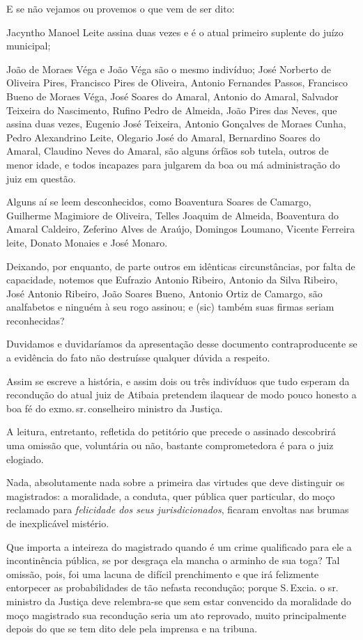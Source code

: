 E se não vejamos ou provemos o que vem de ser dito:

Jacyntho Manoel Leite assina duas vezes e é o atual primeiro suplente do
juízo municipal;

João de Moraes Véga e João Véga são o mesmo indivíduo; José Norberto de
Oliveira Pires, Francisco Pires de Oliveira, Antonio Fernandes Passos,
Francisco Bueno de Moraes Véga, José Soares do Amaral, Antonio do
Amaral, Salvador Teixeira do Nascimento, Rufino Pedro de Almeida, João
Pires das Neves, que assina duas vezes, Eugenio José Teixeira, Antonio
Gonçalves de Moraes Cunha, Pedro Alexandrino Leite, Olegario José do
Amaral, Bernardino Soares do Amaral, Claudino Neves do Amaral, são
alguns órfãos sob tutela, outros de menor idade, e todos incapazes para
julgarem da boa ou má administração do juiz em questão.

Alguns aí se leem desconhecidos, como Boaventura Soares de Camargo,
Guilherme Magimiore de Oliveira, Telles Joaquim de Almeida, Boaventura
do Amaral Caldeiro, Zeferino Alves de Araújo, Domingos Loumano, Vicente
Ferreira leite, Donato Monaies e José Monaro.

Deixando, por enquanto, de parte outros em idênticas circunstâncias, por
falta de capacidade, notemos que Eufrazio Antonio Ribeiro, Antonio da
Silva Ribeiro, José Antonio Ribeiro, João Soares Bueno, Antonio Ortiz de
Camargo, são analfabetos e ninguém à seu rogo assinou; e (sic) também
suas firmas seriam reconhecidas?

Duvidamos e duvidaríamos da apresentação desse documento
contraproducente se a evidência do fato não destruísse qualquer dúvida a
respeito.

Assim se escreve a história, e assim dois ou três indivíduos que tudo
esperam da recondução do atual juiz de Atibaia pretendem ilaquear de
modo pouco honesto a boa fé do exmo.\,sr.\,conselheiro ministro da
Justiça.

A leitura, entretanto, refletida do petitório que precede o assinado
descobrirá uma omissão que, voluntária ou não, bastante comprometedora é
para o juiz elogiado.

Nada, absolutamente nada sobre a primeira das virtudes que deve
distinguir os magistrados: a moralidade, a conduta, quer pública quer
particular, do moço reclamado para \emph{felicidade dos seus
jurisdicionados}, ficaram envoltas nas brumas de inexplicável mistério.

Que importa a inteireza do magistrado quando é um crime qualificado para
ele a incontinência pública, se por desgraça ela mancha o arminho de sua
toga? Tal omissão, pois, foi uma lacuna de difícil prenchimento e que
irá felizmente entorpecer as probabilidades de tão nefasta recondução;
porque S.\,Excia. o sr.\,ministro da Justiça deve relembra-se que sem
estar convencido da moralidade do moço magistrado sua recondução seria
um ato reprovado, muito principalmente depois do que se tem dito dele
pela imprensa e na tribuna.

